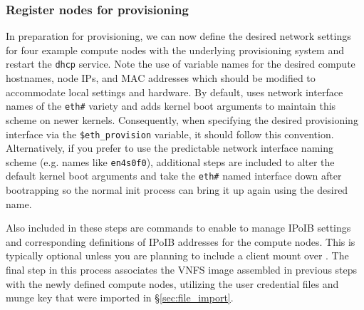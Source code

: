 \subsubsection{Register nodes for provisioning}

In preparation for provisioning, we can now define the desired network settings
for four example compute nodes with the underlying provisioning system and
restart the \texttt{dhcp} service. Note the use of variable names for the
desired compute hostnames, node IPs, and MAC addresses which should be modified
to accommodate local settings and hardware.  By default, \Warewulf{} uses
network interface names of the \texttt{eth\#} variety and adds kernel boot
arguments to maintain this scheme on newer kernels. Consequently, when specifying
the desired provisioning interface via the \texttt{\$eth\_provision} variable,
it should follow this convention. Alternatively, if you prefer to use the
predictable network interface naming scheme (e.g. names like \texttt{en4s0f0}),
additional steps are included to alter the default kernel boot arguments and take
the \texttt{eth\#} named interface down after bootrapping so the normal init
process can bring it up again using the desired name.

Also included in these steps are commands
to enable \Warewulf{} to manage IPoIB settings and corresponding definitions of
IPoIB addresses for the compute nodes. This is typically optional unless you
are planning to include a \Lustre{} client mount over \InfiniBand{}. The final step
in this process associates the VNFS image assembled in previous steps with the
newly defined compute nodes, utilizing the user credential files and munge key
that were imported in \S\ref{sec:file_import}.

